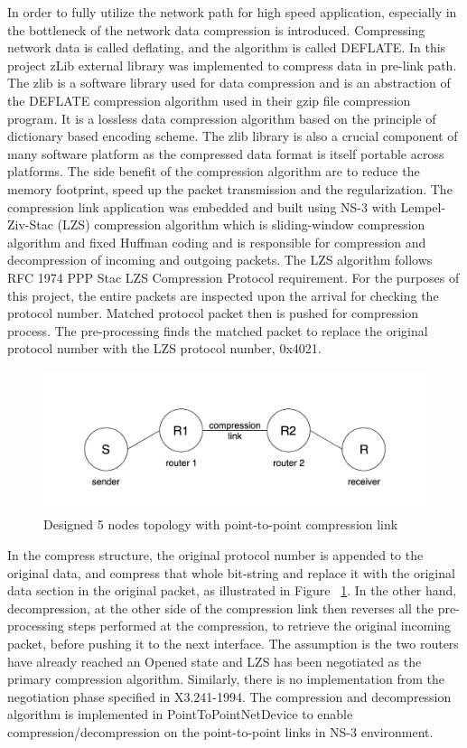 \documentclass[sigconf]{acmart}
\begin{document}
 In order to fully utilize the network path for high speed application, especially in the bottleneck of the network data compression is introduced. Compressing network data  is called deflating, and the algorithm is called DEFLATE.
 In this project zLib external library was implemented to compress data in pre-link path. The zlib \cite{Deutsch:1996:ZCD:RFC1950} is a software library used for data compression and is an abstraction of the DEFLATE compression algorithm used in their gzip file compression program. It is a lossless data compression algorithm based on the principle of dictionary based encoding scheme. The zlib library is also a crucial component of many software platform as the compressed data format is itself portable across platforms. The side benefit of the compression algorithm are to reduce the memory footprint, speed up the packet transmission and the regularization. 
The compression link application was embedded and built using NS-3 with Lempel-Ziv-Stac (LZS)  \cite{Deutsch:1996:ZCD:RFC1950} compression algorithm which is sliding-window compression algorithm and fixed Huffman coding and is  responsible for compression and decompression of incoming and outgoing packets. The LZS algorithm follows RFC 1974 PPP Stac LZS Compression Protocol \cite{Deutsch:1996:ZCD:RFC1950} requirement.
For the purposes of this project, the entire packets are inspected upon the arrival for checking the protocol number.  Matched protocol packet then is pushed for compression process. The pre-processing  finds the matched packet to replace the original protocol number with the LZS protocol number, 0x4021. 

\begin{figure}[h]
  \centering
  \includegraphics[width=\linewidth]{topology}
  \caption{Designed 5 nodes topology with point-to-point compression link }
  \label{fig:Topo}
\end{figure}

In the compress structure, the original protocol number is appended to the original data, and compress that whole bit-string and replace it with the original data section in the original packet, as illustrated in Figure ~\ref{fig:Topo}. 
In the other hand, decompression, at the other side of the compression link then reverses all the pre-processing steps performed at the compression, to retrieve the original incoming packet, before pushing it to the next interface. The assumption is the two routers have already reached an Opened state and LZS has been negotiated as the primary compression algorithm. Similarly, there is no implementation from the negotiation phase specified in X3.241-1994. The compression and decompression algorithm is implemented in PointToPointNetDevice to enable compression/decompression on the point-to-point links in NS-3 environment. 
\end{document}
